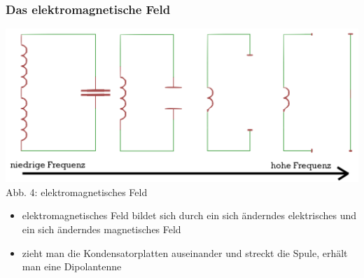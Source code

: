\begin{frame}
    \frametitle{Das elektromagnetische Feld}

    \begin{center}
        \includegraphics[width=\textwidth,height=.5\textheight,keepaspectratio]{a08/dipol_entstehung.png}\\
            {\scriptsize Abb. 4: elektromagnetisches Feld
            }
    \end{center}

    \begin{itemize}
        \item elektromagnetisches Feld bildet sich durch ein sich änderndes
              elektrisches und ein sich änderndes magnetisches Feld
    	\item zieht man die Kondensatorplatten auseinander und streckt die Spule, erhält man eine Dipolantenne 
    \end{itemize}

\end{frame}

